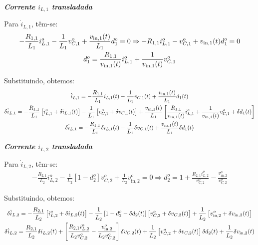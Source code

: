 \textbf{\textit{Corrente $i_{L,1}$ transladada}} \vspace*{12pt}

Para $\dot{i}_{L,1}$, têm-se:
\begin{gather}
  - \frac{R_{1,1}}{L_1} i_{L,1}^o - \frac{1}{L_1} v_{C,1}^o + \frac{v_{\text{in}, 1}(t)}{L_1} d_1^o = 0 \Rightarrow
  - R_{1,1} i_{L,1}^o - v_{C,1}^o + v_{\text{in}, 1}(t) d_1^o = 0 \nle
  d_1^o = \frac{R_{1,1}}{v_{\text{in}, 1}(t)} i_{L,1}^o + \frac{1}{v_{\text{in}, 1}(t)} v_{C,1}^o
\end{gather}

Substituindo, obtemos:
\begin{gather}
  \dot{i}_{L,1} = - \frac{R_{1,1}}{L_1} i_{L,1}(t) - \frac{1}{L_1} v_{C,1}(t) + \frac{v_{\text{in}, 1}(t)}{L_1} d_1(t) \nle
  \delta \dot{i}_{L,1} = - \frac{R_{1,1}}{L_1} \left[i_{L,1}^o + \delta i_{L,1}(t)\right]
  - \frac{1}{L_1} \left[v_{C,1}^o + \delta v_{C,1}(t)\right]
  + \frac{v_{\text{in}, 1}(t)}{L_1} \left[\frac{R_{1,1}}{v_{\text{in}, 1}(t)} i_{L,1}^o + \frac{1}{v_{\text{in}, 1}(t)} v_{C,1}^o + \delta d_1(t)\right] \nle
  \delta \dot{i}_{L,1} = - \frac{R_{1,1}}{L_1} \delta i_{L,1}(t) - \frac{1}{L_1} \delta v_{C,1}(t) + \frac{v_{\text{in}, 1}(t)}{L_1} \delta d_1(t)
\end{gather}

\textbf{\textit{Corrente $i_{L,2}$ transladada}} \vspace*{12pt}

Para $\dot{i}_{L,2}$, têm-se:
\begin{gather}
  - \frac{R_{2,1}}{L_2} i_{L,2}^o - \frac{1}{L_2} \left[1 - d_2^o\right] v_{C,2}^o + \frac{1}{L_2} v_{\text{in},2}^o = 0 \Rightarrow
  d_2^o = 1 + \frac{R_{2,1}i_{L,2}^o}{v_{C,2}^o} - \frac{v_{\text{in},2}^o}{v_{C,2}^o}
\end{gather}

Substituindo, obtemos:
\begin{gather}
  \delta \dot{i}_{L,2} = - \frac{R_{2,1}}{L_2} \left[i_{L,2}^o + \delta i_{L,2}(t)\right] - \frac{1}{L_2} \left[1 - d_2^o - \delta d_2(t)\right] \left[v_{C,2}^o + \delta v_{C,2}(t)\right] + \frac{1}{L_2} \left[v_{\text{in},2}^o + \delta v_{\text{in},2}(t)\right] \nle
  \delta \dot{i}_{L,2} = \frac{R_{2,1}}{L_2} \delta i_{L,2}(t)
  + \left[\frac{R_{2,1} i_{L,2}^o}{L_2 v_{C,2}^o} - \frac{v_{\text{in},2}^o}{L_2 v_{C,2}^o}\right] \delta v_{C,2}(t) + \frac{1}{L_2} \left[v_{C,2}^o + \delta v_{C,2}(t)\right] \delta d_2(t) + \frac{1}{L_2} \delta v_{\text{in},2}(t)
\end{gather}

